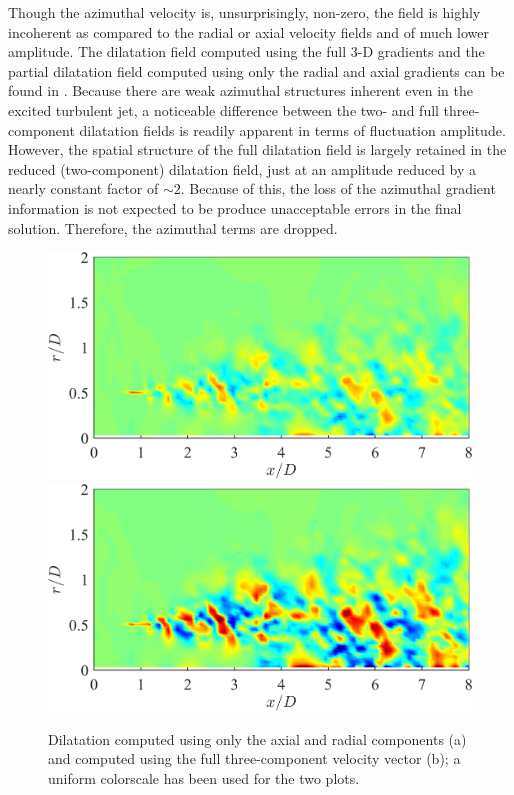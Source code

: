 Though the azimuthal velocity is, unsurprisingly, non-zero, the field is highly incoherent as compared to the radial or axial velocity fields and of much lower amplitude.
The dilatation field computed using the full 3-D gradients and the partial dilatation field computed using only the radial and axial gradients can be found in .
Because there are weak azimuthal structures inherent even in the excited turbulent jet, a noticeable difference between the two- and full three-component dilatation fields is readily apparent in terms of fluctuation amplitude.
However, the spatial structure of the full dilatation field is largely retained in the reduced (two-component) dilatation field, just at an amplitude reduced by a nearly constant factor of $\sim 2$.
Because of this, the loss of the azimuthal gradient information is not expected to be produce unacceptable errors in the final solution.
Therefore, the azimuthal terms are dropped.
\begin{figure}
	\centering
		\includegraphics[width=0.6\linewidth]{Figures/LES_2CDil.png}
		\includegraphics[width=0.6\linewidth]{Figures/LES_3CDil.png}
	\caption{Dilatation computed using only the axial and radial components (a) and computed using the full three-component velocity vector (b); a uniform colorscale has been used for the two plots.}
	\label{fig:LES_streamwise_dil}
\end{figure}
 
